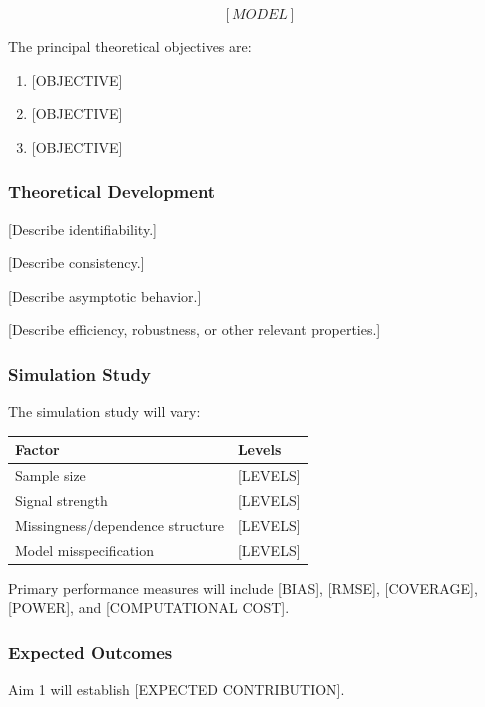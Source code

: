 \documentclass[
  11pt,
  letterpaper,
]{article}
\providecommand{\tightlist}{%
  \setlength{\itemsep}{0pt}\setlength{\parskip}{0pt}}\usepackage{longtable,booktabs,array}
\begin{document}
\[
[MODEL]
\]

The principal theoretical objectives are:

\begin{enumerate}
\def\labelenumi{\arabic{enumi}.}
\tightlist
\item
  {[}OBJECTIVE{]}
\item
  {[}OBJECTIVE{]}
\item
  {[}OBJECTIVE{]}
\end{enumerate}

\subsubsection{Theoretical Development}\label{theoretical-development}

{[}Describe identifiability.{]}

{[}Describe consistency.{]}

{[}Describe asymptotic behavior.{]}

{[}Describe efficiency, robustness, or other relevant properties.{]}

\subsubsection{Simulation Study}\label{simulation-study}

The simulation study will vary:

\begin{longtable}[]{@{}ll@{}}
\toprule\noalign{}
Factor & Levels \\
\midrule\noalign{}
\endhead
\bottomrule\noalign{}
\endlastfoot
Sample size & {[}LEVELS{]} \\
Signal strength & {[}LEVELS{]} \\
Missingness/dependence structure & {[}LEVELS{]} \\
Model misspecification & {[}LEVELS{]} \\
\end{longtable}

Primary performance measures will include {[}BIAS{]}, {[}RMSE{]},
{[}COVERAGE{]}, {[}POWER{]}, and {[}COMPUTATIONAL COST{]}.

\subsubsection{Expected Outcomes}\label{expected-outcomes}

Aim 1 will establish {[}EXPECTED CONTRIBUTION{]}.
\end{document}
